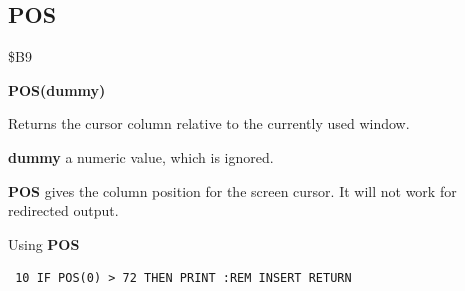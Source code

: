 
\newpage
\subsection{POS}
\begin{description}[leftmargin=2cm,style=nextline]
\item [Token:] \$B9
\item [Format:] {\bf POS(dummy)}
\item [Usage:]  Returns the cursor column relative to the
                currently used window.

                {\bf dummy} a numeric value, which is ignored.

\item [Remarks:] {\bf POS} gives the column position for the screen
                 cursor. It will not work for redirected output.

\item [Example:] Using {\bf POS}

\begin{tcolorbox}[colback=black,coltext=white]
\verbatimfont{\codefont}
\begin{verbatim}
 10 IF POS(0) > 72 THEN PRINT :REM INSERT RETURN
\end{verbatim}
\end{tcolorbox}
\end{description}


\newpage
